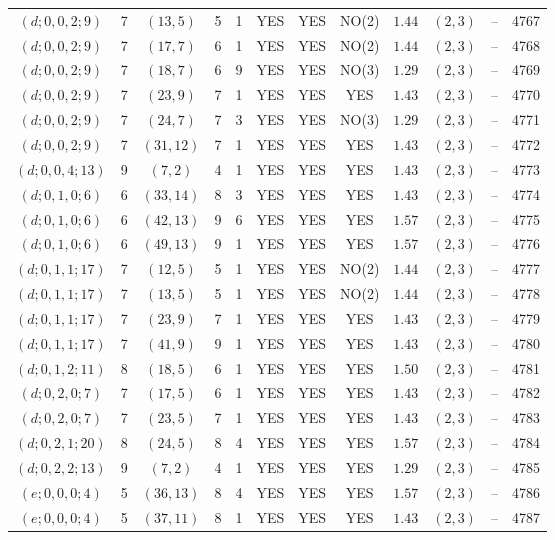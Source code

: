 \begin{longtable}{|c|c|c|c|c|c|c|c|c|c|c|c|}
$(d;0,0,2;9)$ & 7 & $(13,5)$ & 5 & 1 & YES & YES & NO(2) & $1.44$ & $(2,3)$ & -- & 4767\\
$(d;0,0,2;9)$ & 7 & $(17,7)$ & 6 & 1 & YES & YES & NO(2) & $1.44$ & $(2,3)$ & -- & 4768\\
$(d;0,0,2;9)$ & 7 & $(18,7)$ & 6 & 9 & YES & YES & NO(3) & $1.29$ & $(2,3)$ & -- & 4769\\
$(d;0,0,2;9)$ & 7 & $(23,9)$ & 7 & 1 & YES & YES & YES & $1.43$ & $(2,3)$ & -- & 4770\\
$(d;0,0,2;9)$ & 7 & $(24,7)$ & 7 & 3 & YES & YES & NO(3) & $1.29$ & $(2,3)$ & -- & 4771\\
$(d;0,0,2;9)$ & 7 & $(31,12)$ & 7 & 1 & YES & YES & YES & $1.43$ & $(2,3)$ & -- & 4772\\
$(d;0,0,4;13)$ & 9 & $(7,2)$ & 4 & 1 & YES & YES & YES & $1.43$ & $(2,3)$ & -- & 4773\\
$(d;0,1,0;6)$ & 6 & $(33,14)$ & 8 & 3 & YES & YES & YES & $1.43$ & $(2,3)$ & -- & 4774\\
$(d;0,1,0;6)$ & 6 & $(42,13)$ & 9 & 6 & YES & YES & YES & $1.57$ & $(2,3)$ & -- & 4775\\
$(d;0,1,0;6)$ & 6 & $(49,13)$ & 9 & 1 & YES & YES & YES & $1.57$ & $(2,3)$ & -- & 4776\\
$(d;0,1,1;17)$ & 7 & $(12,5)$ & 5 & 1 & YES & YES & NO(2) & $1.44$ & $(2,3)$ & -- & 4777\\
$(d;0,1,1;17)$ & 7 & $(13,5)$ & 5 & 1 & YES & YES & NO(2) & $1.44$ & $(2,3)$ & -- & 4778\\
$(d;0,1,1;17)$ & 7 & $(23,9)$ & 7 & 1 & YES & YES & YES & $1.43$ & $(2,3)$ & -- & 4779\\
$(d;0,1,1;17)$ & 7 & $(41,9)$ & 9 & 1 & YES & YES & YES & $1.43$ & $(2,3)$ & -- & 4780\\
$(d;0,1,2;11)$ & 8 & $(18,5)$ & 6 & 1 & YES & YES & YES & $1.50$ & $(2,3)$ & -- & 4781\\
$(d;0,2,0;7)$ & 7 & $(17,5)$ & 6 & 1 & YES & YES & YES & $1.43$ & $(2,3)$ & -- & 4782\\
$(d;0,2,0;7)$ & 7 & $(23,5)$ & 7 & 1 & YES & YES & YES & $1.43$ & $(2,3)$ & -- & 4783\\
$(d;0,2,1;20)$ & 8 & $(24,5)$ & 8 & 4 & YES & YES & YES & $1.57$ & $(2,3)$ & -- & 4784\\
$(d;0,2,2;13)$ & 9 & $(7,2)$ & 4 & 1 & YES & YES & YES & $1.29$ & $(2,3)$ & -- & 4785\\
$(e;0,0,0;4)$ & 5 & $(36,13)$ & 8 & 4 & YES & YES & YES & $1.57$ & $(2,3)$ & -- & 4786\\
$(e;0,0,0;4)$ & 5 & $(37,11)$ & 8 & 1 & YES & YES & YES & $1.43$ & $(2,3)$ & -- & 4787\\

\end{longtable}
